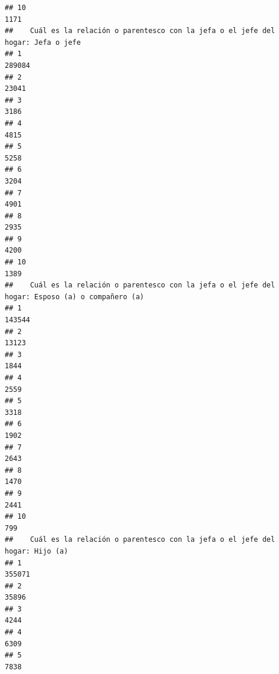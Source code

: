 \documentclass[11pt,]{article}
\begin{document}
\begin{verbatim}
## 10                                                                                            1171
##    Cuál es la relación o parentesco con la jefa o el jefe del hogar: Jefa o jefe
## 1                                                                         289084
## 2                                                                          23041
## 3                                                                           3186
## 4                                                                           4815
## 5                                                                           5258
## 6                                                                           3204
## 7                                                                           4901
## 8                                                                           2935
## 9                                                                           4200
## 10                                                                          1389
##    Cuál es la relación o parentesco con la jefa o el jefe del hogar: Esposo (a) o compañero (a)
## 1                                                                                        143544
## 2                                                                                         13123
## 3                                                                                          1844
## 4                                                                                          2559
## 5                                                                                          3318
## 6                                                                                          1902
## 7                                                                                          2643
## 8                                                                                          1470
## 9                                                                                          2441
## 10                                                                                          799
##    Cuál es la relación o parentesco con la jefa o el jefe del hogar: Hijo (a)
## 1                                                                      355071
## 2                                                                       35896
## 3                                                                        4244
## 4                                                                        6309
## 5                                                                        7838

\end{verbatim}
\end{document}
